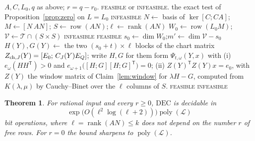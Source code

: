 \documentclass[journal]{IEEEtran}
\theoremstyle{plainn}
\newtheorem{thm}{Theorem}
\theoremstyle{remark}
\begin{document}
\begin{algorithm}[!t]
\caption{Deciding $\mathrm{DEC}(q)$ in time $f(\ell)\operatorname{poly}(\mathcal L)$}
\label{alg:fpt}
\begin{algorithmic}[1]
\Require $A,C,L_0,q$ as above; $r=q-r_0$.
\Ensure \textsc{feasible} or \textsc{infeasible}.
  \State \Return the exact test of Proposition~\ref{prop:zero} on $L=L_0$
\EndIf
{}
  \State \Return \textsc{infeasible} 
\EndIf
\State $N\gets$ basis of $\ker[C;CA]$;\quad $M\gets[N\ AN]$;\quad
$S\gets\operatorname{row}(AN)$;\quad $\ell\gets\operatorname{rank}(AN)$
\State $W_0\gets\operatorname{row}(L_0M)$;\quad
$\mathcal V\gets\mathcal T\cap(S\times S)$
  \State \Return \textsc{infeasible} 
\EndIf
{}
  \State \Return \textsc{feasible} 
\EndIf
\State $s_0\gets\dim W_0$;\quad $m'\gets\dim\mathcal V-s_0$
    \State $H(Y),G(Y)\gets$ the two $(s_0+t)\times\ell$ blocks of the chart matrix
             $Z_{{\rm ch},J}(Y)=[E_0;\,C_J(Y)E_Q]$; write $H,G$ for them
    \Statex \quad {}
      \State form $\Psi_{t,\omega}(Y,x)$ with
      \Statex \quad (i) $e_\omega(HH^{\mathsf T})>0$ and
               $e_{\omega+1}\bigl([H;G][H;G]^{\mathsf T}\bigr)=0$;
      \Statex \quad (ii) $Z(Y)^{\mathsf T}Z(Y)x=e_0$, with $Z(Y)$ the window matrix of
               Claim~\ref{lem:window} for $\lambda H-G$, computed from $K(\lambda,\mu)$ by
               Cauchy--Binet over the $\ell$ columns of $S$.
        \State \Return \textsc{feasible}
      \EndIf
    \EndFor
  \EndFor
\EndFor
\State \Return \textsc{infeasible}
\end{algorithmic}
\end{algorithm}

\begin{thm}\label{thm:fpt}
For rational input and every $r\ge0$, $\mathrm{DEC}$ is decidable in
\begin{equation}\label{eq:fpt-l}
\exp\bigl(O(\ell^2\log(\ell+2))\bigr)\operatorname{poly}(\mathcal L)
\end{equation}
bit operations, where $\ell=\operatorname{rank}(AN)\le k$ does not depend on the number $r$ of
free rows. For $r=0$ the bound sharpens to $\operatorname{poly}(\mathcal L)$.
\end{thm}
\end{document}
